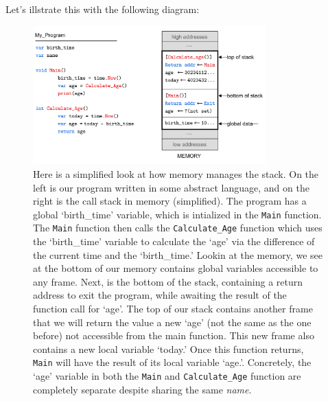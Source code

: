 \newpage 

\noindent
Let's illstrate this with the following diagram:

\begin{figure}[h]
    \centering
    \includegraphics[width=0.8\textwidth]{./Sections/stacks_heaps/call_stack.png}
    \caption{Here is a simplified look at how memory manages the stack. On the left is our program written 
    in some abstract language, and on the right is the call stack in memory (simplified). 
    The program has a global `birth\_time' variable, which is intialized in the \texttt{Main} function. The \texttt{Main} function
    then calls the \texttt{Calculate\_Age} function which uses the `birth\_time' variable to calculate the `age' via the difference of 
    the current time and the `birth\_time.'
    Lookin at the memory, we see at the bottom of our memory contains global variables accessible to any frame. Next, is the bottom of the stack, containing a return address to exit 
    the program, while awaiting the result of the function call for `age'. The top of our stack contains another frame that we will return the value
    a new `age' (not the same as the one before) not accessible from the main function. This new frame also contains a new local variable `today.'
    Once this function returns, \texttt{Main} will have the result of its local variable `age.'. Concretely, the 
    `age' variable in both the \texttt{Main} and \texttt{Calculate\_Age} function are completely separate despite sharing the same \textit{name}.}
    \label{fig:call_stack}
\end{figure}

